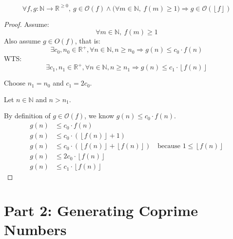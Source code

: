 \documentclass[fontsize=11pt]{article}
\newcommand{\N}{\mathbb{N}}
\newcommand{\R}{\mathbb{R}}
\newcommand{\cO}{\mathcal{O}}
\newcommand{\floor}[1]{\left\lfloor #1 \right\rfloor}
\begin{document}
\begin{enumerate}
$$\forall f, g: \N \to \R^{\geq 0},~ g \in \cO(f) \land \big(\forall m \in \N,~ f(m) \geq 1 \big) \Rightarrow g \in \cO(\floor{f})$$

\begin{proof}
Assume: 
$$\forall m \in \N,~ f(m) \geq 1$$
Also assume $g \in O(f)$, that is:
$$\exists c_0, n_0 \in \R^+, \forall n \in \N, n \geq n_0 \Rightarrow g(n) \leq c_0 \cdot f(n)$$
WTS: $$\exists c_1, n_1 \in \R^+, \forall n \in \N, n \geq n_1 \Rightarrow g(n) \leq c_1 \cdot \floor{f(n)}$$

Choose $n_1 = n_0$ and $c_1 = 2c_0$.

Let $n \in \N$ and $n > n_1$.

By definition of $g \in \cO(f)$, we know $g(n) \leq c_0 \cdot f(n)$.
\begin{align*}
    g(n) &\leq c_0 \cdot f(n)\\
    g(n) &\leq c_0 \cdot (\floor{f(n)} + 1)\\
    g(n) &\leq c_0 \cdot (\floor{f(n)} + \floor{f(n)}) \quad{\text{because } 1 \leq \floor{f(n)}} \\
    g(n) &\leq 2c_0 \cdot \floor{f(n)}\\
    g(n) &\leq c_1 \cdot \floor{f(n)}
\end{align*}
\end{proof}

\end{enumerate}

\newpage

\section*{Part 2: Generating Coprime Numbers}
\end{document}
